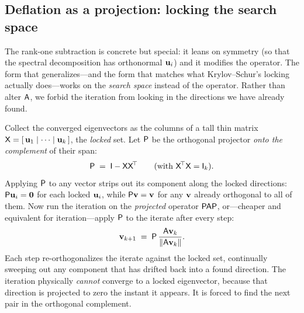 \subsection{Deflation as a projection: locking the search space}
\label{sec:def-locking}

The rank-one subtraction is concrete but special: it leans on symmetry (so that
the spectral decomposition has orthonormal $\mathbf{u}_i$) and it modifies the operator.
The form that generalizes---and the form that matches what Krylov--Schur's locking
actually does---works on the \emph{search space} instead of the operator. Rather
than alter $\mathsf{A}$, we forbid the iteration from looking in the directions we
have already found.

Collect the converged eigenvectors as the columns of a tall thin matrix
$\mathsf{X}=[\,\mathbf{u}_1\mid\cdots\mid\mathbf{u}_k\,]$, the \emph{locked} set. Let $\mathsf{P}$ be
the orthogonal projector \emph{onto the complement} of their span:
\begin{equation}
  \mathsf{P} \;=\; \mathsf{I} - \mathsf{X}\mathsf{X}^{\!\top}
  \qquad(\text{with } \mathsf{X}^{\!\top}\mathsf{X}=\mathsf{I}_k).
  \label{eq:deflate-proj}
\end{equation}
Applying $\mathsf{P}$ to any vector strips out its component along the locked
directions: $\mathsf{P}\mathbf{u}_i=\mathbf 0$ for each locked $\mathbf{u}_i$, while $\mathsf{P}\mathbf{v}=\mathbf{v}$
for any $\mathbf{v}$ already orthogonal to all of them. Now run the iteration on the
\emph{projected} operator $\mathsf{P}\mathsf{A}\mathsf{P}$, or---cheaper and equivalent for
iteration---apply $\mathsf{P}$ to the iterate after every step:
\begin{equation}
  \mathbf{v}_{k+1} \;=\; \mathsf{P}\,\frac{\mathsf{A}\mathbf{v}_k}{\lVert\mathsf{A}\mathbf{v}_k\rVert}.
  \label{eq:deflate-iterate}
\end{equation}
Each step re-orthogonalizes the iterate against the locked set, continually
sweeping out any component that has drifted back into a found direction. The
iteration physically \emph{cannot} converge to a locked eigenvector, because that
direction is projected to zero the instant it appears. It is forced to find the
next pair in the orthogonal complement.

